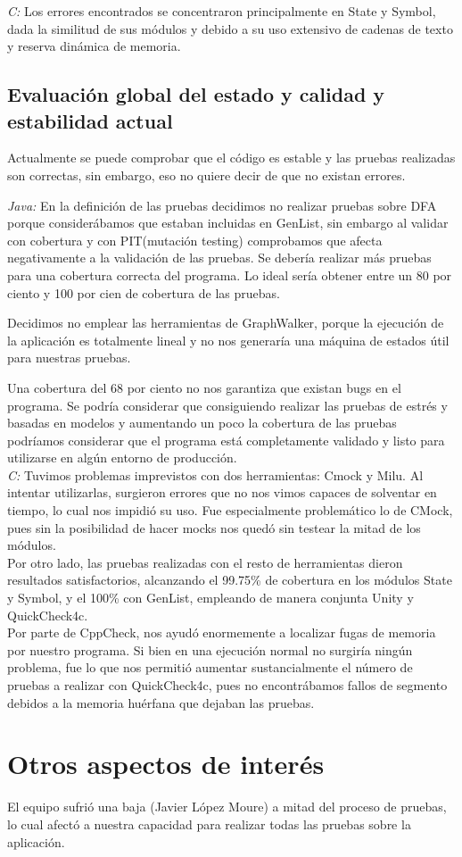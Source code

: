 \documentclass[DIV=calc,paper=a4,fontsize=11pt,onecolumn]{scrartcl} %
\begin{document}
  	\textit{C:} Los errores encontrados se concentraron principalmente en State y Symbol, dada la similitud de sus módulos y debido a su uso extensivo de cadenas de texto y reserva dinámica de memoria.
  	
	\subsection{Evaluación global del estado y calidad y estabilidad actual}
  	Actualmente se puede comprobar que el código es estable y las pruebas realizadas son correctas, sin embargo, eso no quiere decir de que no existan errores.
  	
  	\textit{Java:} En la definición de las pruebas decidimos no realizar pruebas sobre DFA porque considerábamos que estaban incluidas en GenList, sin embargo al validar con cobertura y con PIT(mutación testing) comprobamos que afecta negativamente a la validación de las pruebas. Se debería realizar más pruebas para una cobertura correcta del programa. Lo ideal sería obtener entre un 80 por ciento y 100 por cien de cobertura de las pruebas. 
  	
  	Decidimos no emplear las herramientas de GraphWalker, porque la ejecución de la aplicación es totalmente lineal y no nos generaría una máquina de estados útil para nuestras pruebas.
  	
  	Una cobertura del 68 por ciento no nos garantiza que existan bugs en el programa. Se podría considerar que consiguiendo realizar las pruebas de estrés y basadas en modelos y aumentando un poco la cobertura de las pruebas podríamos considerar que el programa está completamente validado y listo para utilizarse en algún entorno de producción. \\

	\textit{C:} Tuvimos problemas imprevistos con dos herramientas: Cmock y Milu. Al intentar utilizarlas, surgieron errores que no nos vimos capaces de solventar en tiempo, lo cual nos impidió su uso. Fue especialmente problemático lo de CMock, pues sin la posibilidad de hacer mocks nos quedó sin testear la mitad de los módulos. \\
	
	Por otro lado, las pruebas realizadas con el resto de herramientas dieron resultados satisfactorios, alcanzando el 99.75\% de cobertura en los módulos State y Symbol, y el 100\% con GenList, empleando de manera conjunta Unity y QuickCheck4c. \\
	
	Por parte de CppCheck, nos ayudó enormemente a localizar fugas de memoria por nuestro programa. Si bien en una ejecución normal no surgiría ningún problema, fue lo que nos permitió aumentar sustancialmente el número de pruebas a realizar con QuickCheck4c, pues no encontrábamos fallos de segmento debidos a la memoria huérfana que dejaban las pruebas.

\section{Otros aspectos de interés}

El equipo sufrió una baja (Javier López Moure) a mitad del proceso de pruebas, lo cual afectó a nuestra capacidad para realizar todas las pruebas sobre la aplicación. \\
\end{document}
